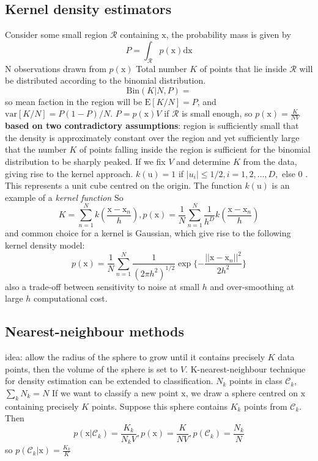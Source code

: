 \documentclass[a4paper]{book}
\begin{document}
\subsection{Kernel density estimators}
Consider some small region $\mathcal R$ containing $\mathrm x$, the probability mass is given by
$$P=\int_{\mathcal R}p(\mathrm x)\mathrm {dx}$$
N observations drawn from $p(\mathrm x)$ \newline
Total number $K$ of points that lie inside $\mathcal R$ will be distributed according to the binomial distribution.
$$\mathrm {Bin}(K|N,P) =$$
so mean faction in the region will be $\mathrm E[K/N] = P$, and $\mathrm {var}[K/N] = P(1-P)/N$.\newline
$P=p(\mathrm x)V$ if $\mathcal R$ is small enough, so $p(\mathrm x) = \frac{K}{NV}$\newline
\textbf{based on two contradictory assumptions}: region is sufficiently small that the density is approximately constant over the region and yet sufficiently large that the number $K$ of points falling inside the region is sufficient for the binomial distribution to be sharply peaked.\newline
If we fix $V$ and determine $K$ from the data,  giving rise to the kernel approach.
$k(\mathrm u) =1$ if $|u_i|\leq 1/2, i=1, 2, \dots, D, $ else $0$ .\newline
This represents a unit cube centred on the origin. The function $k(\mathrm u)$ is an example of a \emph{kernel function}\newline
So $$K = \sum_{n=1}^Nk(\frac{\mathrm x-\mathrm x_n}{h}), p(\mathrm x) = \frac1N\sum_{n=1}^N\frac1{h^D}k(\frac{\mathrm x-\mathrm x_n}{h})$$
and common choice for a kernel is Gaussian, which give rise to the following kernel density model:
$$p(\mathrm x) = \frac1N\sum_{n=1}^N\frac{1}{(2\pi h^2)^{1/2}}\exp\{-\frac{||\mathrm x-\mathrm x_n||^2}{2h^2}\}$$
also a trade-off between sensitivity to noise at small $h$ and over-smoothing at large $h$\newline
computational cost.
\subsection{Nearest-neighbour methods}
idea: allow the radius of the sphere to grow until it contains precisely $K$ data points, then the volume of the sphere is set to $V$.\newline
K-nearest-neighbour technique for density estimation can be extended to classification.
$N_k$ points in class $\mathcal C_k$, $\sum_kN_k=N$
\newline
If we want to classify a new point $\mathrm x$, we draw a sphere centred on $\mathrm x$ containing precisely $K$ points. Suppose this sphere contains $K_k$ points from $\mathcal C_k$. Then
$$p(\mathrm x|\mathcal C_k) = \frac{K_k}{N_kV} , p(\mathrm x) = \frac{K}{NV}, p(\mathcal C_k) = \frac{N_k}{N}$$
so $p(\mathcal C_k|\mathrm x) = \frac{K_k}{K}$
\end{document}
